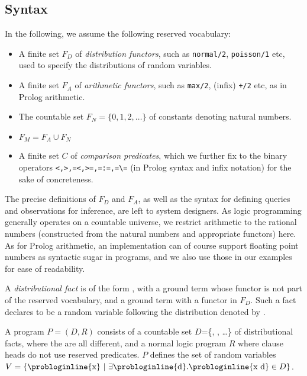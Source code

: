 \subsection{Syntax}
In the following, we assume the following reserved vocabulary:
\begin{itemize}
    \item A finite set $F_D$ of \emph{distribution functors}, such as \verb|normal/2|, \verb|poisson/1| etc, used to specify the distributions of random variables.
    \item A finite set $F_A$ of \emph{arithmetic functors}, such as \verb|max/2|, (infix) \verb|+/2| etc, as in Prolog arithmetic.
    \item The countable set $F_N=\{0,1,2,\ldots\}$ of constants denoting natural numbers.
    \item $F_M = F_A\cup F_N$
    \item A finite set $C$ of \emph{comparison predicates}, which we further fix to the binary 
    operators \verb|<,>,=<,>=,=:=,=\=| (in Prolog syntax and infix notation) for the sake of concreteness.
\end{itemize}
The precise definitions of $F_D$ and $F_A$, as well as the syntax for defining queries and observations for inference, are left to system designers. 
As logic programming generally operates on a countable universe, we restrict arithmetic to the rational numbers (constructed from the natural numbers and appropriate functors) here. As for Prolog arithmetic, an implementation can of course support floating point numbers as syntactic sugar in programs, and we also use those in our examples for ease of readability. 

\begin{definition}
A \emph{distributional fact} is of the form , with  a ground term whose functor is not part of the reserved vocabulary, and  a ground term with a functor in $F_D$. Such a fact declares  to be a random variable following the distribution denoted by . 
\end{definition}

\begin{definition}
A \dcproblogsty program $P=(D,R)$ consists of
a countable set $D$=\{, , \ldots\} of distributional facts, where the  are all different, and a normal logic program $R$ where clause heads do not use reserved predicates. $P$ defines the set of random variables $V=\{\text{\probloginline{x}}~|~\exists \text{\probloginline{d}}. \text{\probloginline{x~d}}\in D\}$. 
\end{definition}


